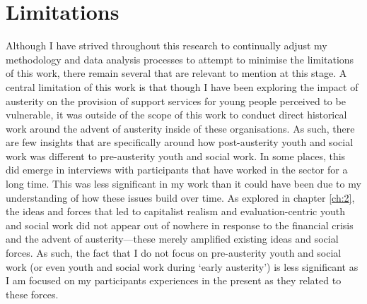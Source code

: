 \section{Limitations}

Although I have strived throughout this research to continually adjust my methodology and data analysis processes to attempt to minimise the limitations of this work, there remain several that are relevant to mention at this stage. A central limitation of this work is that though I have been exploring the impact of austerity on the provision of support services for young people perceived to be vulnerable, it was outside of the scope of this work to conduct direct historical work around the advent of austerity inside of these organisations. As such, there are few insights that are specifically around how post-austerity youth and social work was different to pre-austerity youth and social work. In some places, this did emerge in interviews with participants that have worked in the sector for a long time. This was less significant in my work than it could have been due to my understanding of how these issues build over time. As explored in chapter \ref{ch:2}, the ideas and forces that led to capitalist realism and evaluation-centric youth and social work did not appear out of nowhere in response to the financial crisis and the advent of austerity—these merely amplified existing ideas and social forces. As such, the fact that I do not focus on pre-austerity youth and social work (or even youth and social work during `early austerity') is less significant as I am focused on my participants experiences in the present as they related to these forces. 

